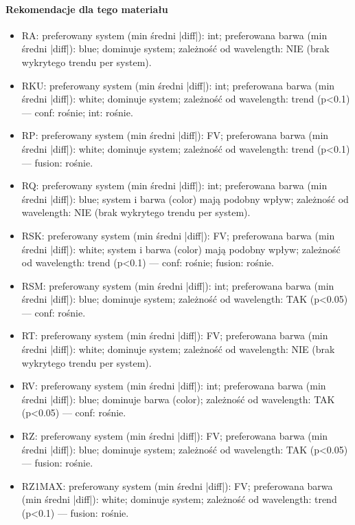 \documentclass[
  10pt,
]{article}
\begin{document}
\paragraph{Rekomendacje dla tego materiału}
\begin{itemize}
\item RA: preferowany system (min średni |diff|): int; preferowana barwa (min średni |diff|): blue; dominuje system; zależność od wavelength: NIE (brak wykrytego trendu per system).
\item RKU: preferowany system (min średni |diff|): int; preferowana barwa (min średni |diff|): white; dominuje system; zależność od wavelength: trend (p<0.1) — conf: rośnie; int: rośnie.
\item RP: preferowany system (min średni |diff|): FV; preferowana barwa (min średni |diff|): white; dominuje system; zależność od wavelength: trend (p<0.1) — fusion: rośnie.
\item RQ: preferowany system (min średni |diff|): int; preferowana barwa (min średni |diff|): blue; system i barwa (color) mają podobny wpływ; zależność od wavelength: NIE (brak wykrytego trendu per system).
\item RSK: preferowany system (min średni |diff|): FV; preferowana barwa (min średni |diff|): white; system i barwa (color) mają podobny wpływ; zależność od wavelength: trend (p<0.1) — conf: rośnie; fusion: rośnie.
\item RSM: preferowany system (min średni |diff|): int; preferowana barwa (min średni |diff|): blue; dominuje system; zależność od wavelength: TAK (p<0.05) — conf: rośnie.
\item RT: preferowany system (min średni |diff|): FV; preferowana barwa (min średni |diff|): white; dominuje system; zależność od wavelength: NIE (brak wykrytego trendu per system).
\item RV: preferowany system (min średni |diff|): int; preferowana barwa (min średni |diff|): blue; dominuje barwa (color); zależność od wavelength: TAK (p<0.05) — conf: rośnie.
\item RZ: preferowany system (min średni |diff|): FV; preferowana barwa (min średni |diff|): blue; dominuje system; zależność od wavelength: TAK (p<0.05) — fusion: rośnie.
\item RZ1MAX: preferowany system (min średni |diff|): FV; preferowana barwa (min średni |diff|): white; dominuje system; zależność od wavelength: trend (p<0.1) — fusion: rośnie.
\end{itemize}
\end{document}
